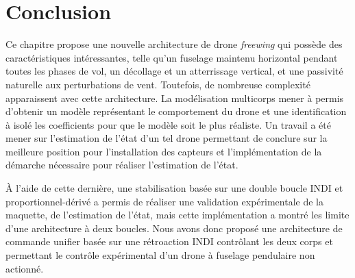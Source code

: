 \section{Conclusion}

Ce chapitre propose une nouvelle architecture de drone \textit{freewing} qui possède des caractéristiques intéressantes, telle qu'un fuselage maintenu horizontal pendant toutes les phases de vol, un décollage et un atterrissage vertical, et une passivité naturelle aux perturbations de vent. Toutefois, de nombreuse complexité apparaissent avec cette architecture. La modélisation multicorps mener à permis d'obtenir un modèle représentant le comportement du drone et une identification à isolé les coefficients pour que le modèle soit le plus réaliste. Un travail a été mener sur l'estimation de l'état d'un tel drone permettant de conclure sur la meilleure position pour l'installation des capteurs et l'implémentation de la démarche nécessaire pour réaliser l'estimation de l'état. 

À l'aide de cette dernière, une stabilisation basée sur une double boucle INDI et proportionnel-dérivé a permis de réaliser une validation expérimentale de la maquette, de l'estimation de l'état, mais cette implémentation a montré les limite d'une architecture à deux boucles. Nous avons donc proposé une architecture de commande unifier basée sur une rétroaction INDI contrôlant les deux corps et permettant le contrôle expérimental d'un drone à fuselage pendulaire non actionné.







